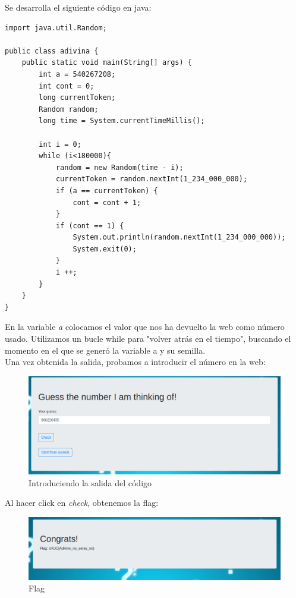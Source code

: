 \documentclass[12pt, a4paper,twoside,titlepage]{article}
\begin{document}
Se desarrolla el siguiente código en java:

\begin{verbatim}
import java.util.Random;

public class adivina {
    public static void main(String[] args) {
        int a = 540267208;
        int cont = 0;
        long currentToken;
        Random random;
        long time = System.currentTimeMillis();

        int i = 0;
        while (i<180000){
            random = new Random(time - i);
            currentToken = random.nextInt(1_234_000_000);
            if (a == currentToken) {
                cont = cont + 1;
            }
            if (cont == 1) {
                System.out.println(random.nextInt(1_234_000_000));
                System.exit(0);
            }
            i ++;
        }
    }
}
\end{verbatim}

En la variable \emph{a} colocamos el valor que nos ha devuelto la web como número usado. Utilizamos un bucle while para "volver atrás en el tiempo", buscando el momento en el que se generó la variable a y su semilla.\\

Una vez obtenida la salida, probamos a introducir el número en la web:\\

\begin{figure}[H]
    \centering
    \includegraphics[width=1\linewidth]{Figuras/Adivina/4.png}
    \caption{Introduciendo la salida del código}
    \label{fig:Adivina}
\end{figure}

Al hacer click en \emph{check}, obtenemos la flag:

\begin{figure}[h]
    \centering
    \includegraphics[width=1\linewidth]{Figuras/Adivina/Flag.png}
    \caption{Flag}
    \label{fig:Adivina}
\end{figure}
\end{document}
